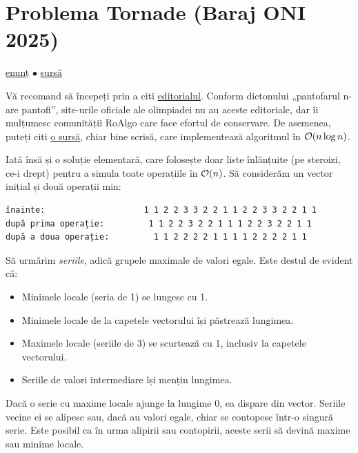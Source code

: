 \documentclass[../main.tex]{subfiles}
\begin{document}
\section{Problema Tornade (Baraj ONI 2025)}
\label{problem:tornade}

\href{https://kilonova.ro/problems/3732}{enunț}
$\bullet$
\hyperref[code:tornade]{sursă}

Vă recomand să începeți prin a citi \href{https://github.com/roalgo-discord/Romanian-Olympiad-Solutions/blob/main/Baraj\%20\%2B\%20Lot\%20Seniori\%20(IOI\%20team\%20selection\%20tests)/2025/Editorial\%20baraje\%20ziua\%201\%20\%C8\%99i\%202.pdf}{editorialul}. Conform dictonului „pantofarul n-are pantofi”, site-urile oficiale ale olimpiadei nu au aceste editoriale, dar îi mulțumesc comunității RoAlgo care face efortul de conservare. De asemenea, puteți citi \href{https://kilonova.ro/submissions/722218}{o sursă}, chiar bine scrisă, care implementează algoritmul în $\mathcal{O}(n \log n)$.

Iată însă și o soluție elementară, care folosește doar liste înlănțuite (pe steroizi, ce-i drept) pentru a simula toate operațiile în $\mathcal{O}(n)$. Să considerăm un vector inițial și două operații min:

\begin{verbatim}
înainte:                    1 1 2 2 3 3 2 2 1 1 2 2 3 3 2 2 1 1
după prima operație:         1 1 2 2 3 2 2 1 1 1 2 2 3 2 2 1 1
după a doua operație:         1 1 2 2 2 2 1 1 1 1 2 2 2 2 1 1
\end{verbatim}

Să urmărim \textit{seriile}, adică grupele maximale de valori egale. Este destul de evident că:

\begin{itemize}
  \item Minimele locale (seria de 1) se lungesc cu 1.
  \item Minimele locale de la capetele vectorului își păstrează lungimea.
  \item Maximele locale (seriile de 3) se scurtează cu 1, inclusiv la capetele vectorului.
  \item Seriile de valori intermediare își mențin lungimea.
\end{itemize}

Dacă o serie cu maxime locale ajunge la lungime 0, ea dispare din vector. Seriile vecine ei se alipesc sau, dacă au valori egale, chiar se contopesc într-o singură serie. Este posibil ca în urma alipirii sau contopirii, aceste serii să devină maxime sau minime locale.
\end{document}
